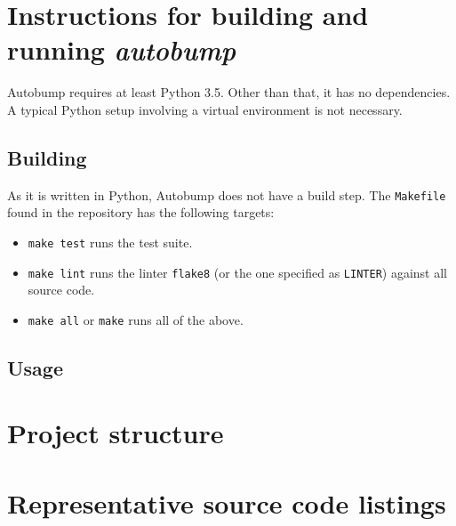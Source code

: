 \documentclass{l4proj}
\begin{document}
\begin{appendices}

\chapter{Instructions for building and running \textit{autobump}}

Autobump requires at least Python 3.5. Other than that, it has no
dependencies. A typical Python setup involving a virtual environment
is not necessary.

\section{Building}

As it is written in Python, Autobump does not have a build step. The
\texttt{Makefile} found in the repository has the following targets:

\begin{itemize}
\item \texttt{make test} runs the test suite.
\item \texttt{make lint} runs the linter \texttt{flake8} (or the one
specified as \texttt{LINTER}) against all source code.
\item \texttt{make all} or \texttt{make} runs all of the above.
\end{itemize}

\section{Usage}

\chapter{Project structure}

\chapter{Representative source code listings}

\end{appendices}



\end{document}
